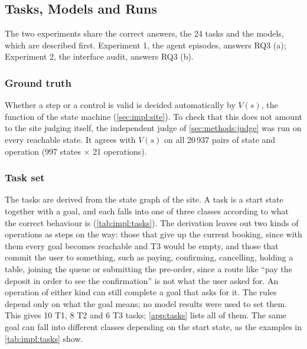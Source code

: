 \FloatBarrier

\subsection{Tasks, Models and Runs}\label{sec:methods:setup}

The two experiments share the correct answers, the 24 tasks and the models, which are described first.
Experiment 1, the agent episodes, answers RQ3 (a); Experiment 2, the interface audit, answers RQ3 (b).

\subsubsection{Ground truth}\label{sec:eval:method:truth}

Whether a step or a control is valid is decided automatically by $V(s)$, the function of the state machine (\autoref{sec:impl:site}).
To check that this does not amount to the site judging itself, the independent judge of \autoref{sec:methods:judge} was run on every reachable state.
It agrees with $V(s)$ on all 20\,937 pairs of state and operation (997 states $\times$ 21 operations).

\subsubsection{Task set}\label{sec:eval:method:tasks}

The tasks are derived from the state graph of the site.
A task is a start state together with a goal, and each falls into one of three classes according to what the correct behaviour is (\autoref{tab:impl:tasks}).
The derivation leaves out two kinds of operations as steps on the way: those that give up the current booking, since with them every goal becomes reachable and T3 would be empty, and those that commit the user to something, such as paying, confirming, cancelling, holding a table, joining the queue or submitting the pre-order, since a route like ``pay the deposit in order to see the confirmation'' is not what the user asked for.
An operation of either kind can still complete a goal that asks for it.
The rules depend only on what the goal means; no model results were used to set them.
This gives 10 T1, 8 T2 and 6 T3 tasks; \autoref{app:tasks} lists all of them.
The same goal can fall into different classes depending on the start state, as the examples in \autoref{tab:impl:tasks} show.


